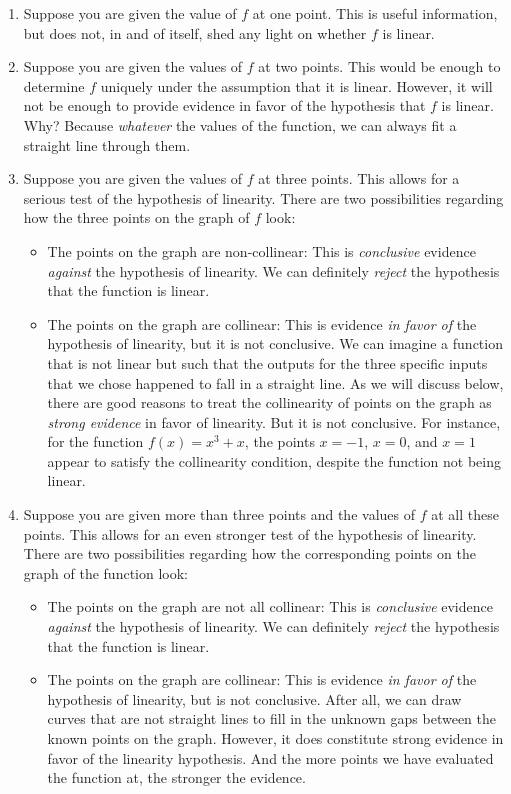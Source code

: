 \documentclass[10pt]{amsart}
\begin{document}
\begin{enumerate}
\item Suppose you are given the value of $f$ at one point. This is
  useful information, but does not, in and of itself, shed any light
  on whether $f$ is linear.
\item Suppose you are given the values of $f$ at two points. This
  would be enough to determine $f$ uniquely under the assumption that
  it is linear. However, it will not be enough to provide evidence in
  favor of the hypothesis that $f$ is linear. Why? Because {\em
    whatever} the values of the function, we can always fit a straight
  line through them.
\item Suppose you are given the values of $f$ at three points. This
  allows for a serious test of the hypothesis of linearity. There are
  two possibilities regarding how the three points on the graph of $f$
  look:

  \begin{itemize}
  \item The points on the graph are non-collinear: This is {\em conclusive}
    evidence {\em against} the hypothesis of linearity. We can
    definitely {\em reject} the hypothesis that the function is
    linear.
  \item The points on the graph are collinear: This is evidence {\em
    in favor of} the hypothesis of linearity, but it is not
    conclusive. We can imagine a function that is not linear but such
    that the outputs for the three specific inputs that we chose
    happened to fall in a straight line. As we will discuss below,
    there are good reasons to treat the collinearity of points on the
    graph as {\em strong evidence} in favor of linearity. But it is
    not conclusive. For instance, for the function $f(x) = x^3 + x$,
    the points $x = -1$, $x = 0$, and $x = 1$ appear to satisfy the
    collinearity condition, despite the function not being linear.
  \end{itemize}

\item Suppose you are given more than three points and the values of
  $f$ at all these points. This allows for an even stronger test of
  the hypothesis of linearity. There are two possibilities regarding
  how the corresponding points on the graph of the function look:

  \begin{itemize}    
  \item The points on the graph are not all collinear: This is {\em
    conclusive} evidence {\em against} the hypothesis of linearity. We
    can definitely {\em reject} the hypothesis that the function is
    linear.
  \item The points on the graph are collinear: This is evidence {\em
    in favor of} the hypothesis of linearity, but is not
    conclusive. After all, we can draw curves that are not straight
    lines to fill in the unknown gaps between the known points on the
    graph. However, it does constitute strong evidence in favor of the
    linearity hypothesis. And the more points we have evaluated the
    function at, the stronger the evidence.
  \end{itemize}
\end{enumerate}
\end{document}
